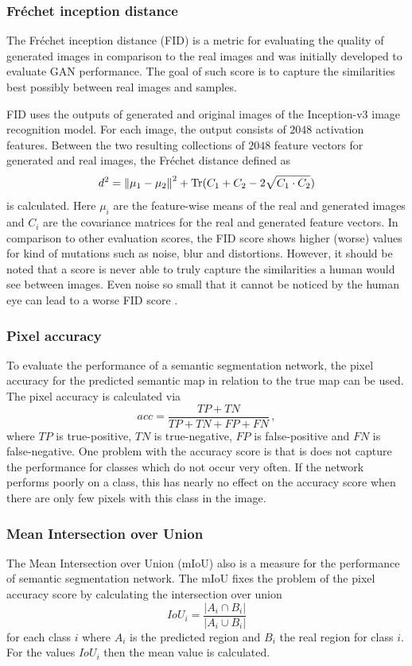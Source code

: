 \subsubsection{Fréchet inception distance} \label{fid}
The Fréchet inception distance (FID) \cite{fid} is a metric for evaluating the quality of generated images in comparison to the real images and was initially developed to evaluate GAN performance. The goal of such score is to capture the similarities best possibly between real images and samples.

FID uses the outputs of generated and original images of the Inception-v3 \cite{inception-v3} image recognition model. For each image, the output consists of $2048$ activation features. Between the two resulting collections of $2048$ feature vectors for generated and real images, the Fréchet distance defined as 
%
\begin{equation}
    d^2=\left\lVert\mu_1-\mu_2\right\rVert^2+\text{Tr}(C_1+C_2-2\sqrt{C_1\cdot C_2})
\end{equation}
%
is calculated. Here $\mu_i$ are the feature-wise means of the real and generated images and $C_i$ are the covariance matrices for the real and generated feature vectors. In comparison to other evaluation scores, the FID score shows higher (worse) values for  kind of mutations such as noise, blur and distortions. However, it should be noted that a score is never able to truly capture the similarities a human would see between images. Even noise so small that it cannot be noticed by the human eye can lead to a worse FID score \cite{score_4}.

\subsubsection{Pixel accuracy} \label{acc}
To evaluate the performance of a semantic segmentation network, the pixel accuracy for the predicted semantic map in relation to the true map can be used. The pixel accuracy is calculated via
%
\begin{equation}
    acc=\frac{TP+TN}{TP+TN+FP+FN}\,,
\end{equation}
%
where $TP$ is true-positive, $TN$ is true-negative, $FP$ is false-positive and $FN$ is false-negative. One problem with the accuracy score is that is does not capture the performance for classes which do not occur very often. If the network performs poorly on a class, this has nearly no effect on the accuracy score when there are only few pixels with this class in the image.
%
\subsubsection{Mean Intersection over Union} \label{iou}
The Mean Intersection over Union (mIoU) also is a measure for the performance of semantic segmentation network. The mIoU fixes the problem of the pixel accuracy score by calculating the intersection over union
%
\begin{equation}
    IoU_{i}=\frac{|A_i\cap B_i|}{|A_i \cup B_i|}
\end{equation}
%
for each class $i$ where $A_i$ is the predicted region and $B_i$ the real region for class $i$. For the values $IoU_i$ then the mean value is calculated.
%
